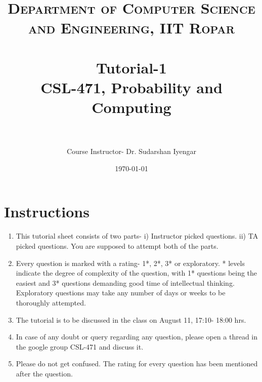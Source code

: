 \documentclass[paper=a4, fontsize=11pt]{scrartcl} %
\title{	
\normalfont \normalsize 
\textsc{Department of Computer Science and Engineering, IIT Ropar} \\ [25pt] %
\horrule{0.5pt} \\[0.4cm] %
\LARGE Tutorial-1  \\ %
\large CSL-471, Probability and Computing  \\ %
\horrule{2pt} \\[0.5cm] %
}
\author{Course Instructor- Dr. Sudarshan Iyengar} %
\date{\normalsize\today} %
\numberwithin{equation}{section} %
\numberwithin{figure}{section} %
\numberwithin{table}{section} %
\begin{document}
\maketitle %


\section{Instructions}
\begin{enumerate}
\item This tutorial sheet consists of two parts- i) Instructor picked questions. ii) TA picked questions. You are supposed to attempt both of the parts. 
\item Every question is marked with a rating- 1*, 2*, 3* or exploratory. * levels indicate the degree of complexity of the question, with 1* questions being the easiest and 3* questions demanding good time of intellectual thinking. Exploratory questions may take any number of days or weeks to be thoroughly attempted. 
\item The tutorial is to be discussed in the class on August 11, 17:10- 18:00 hrs.
\item In case of any doubt or query regarding any question, please open a thread in the google group CSL-471 and discuss it. 
\item Please do not get confused. The rating for every question has been mentioned after the question.
\end{enumerate}

\newpage
\end{document}

